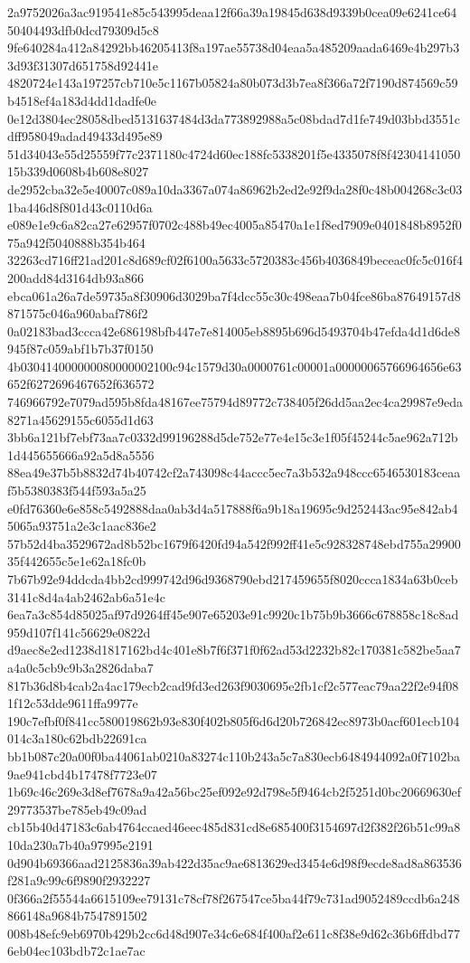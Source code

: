 {2a9752026a3ac919541e85c543995deaa12f66a39a19845d638d9339b0cea09e6241ce6450404493dfb0dcd79309d5c8
9fe640284a412a84292bb46205413f8a197ae55738d04eaa5a485209aada6469e4b297b33d93f31307d651758d92441e
4820724e143a197257cb710e5c1167b05824a80b073d3b7ea8f366a72f7190d874569c59b4518ef4a183d4dd1dadfe0e
0e12d3804ec28058dbed5131637484d3da773892988a5c08bdad7d1fe749d03bbd3551cdff958049adad49433d495e89
51d34043e55d25559f77c2371180c4724d60ec188fc5338201f5e4335078f8f4230414105015b339d0608b4b608e8027
de2952cba32e5e40007c089a10da3367a074a86962b2ed2e92f9da28f0c48b004268c3c031ba446d8f801d43c0110d6a
e089e1e9c6a82ca27e62957f0702c488b49ec4005a85470a1e1f8ed7909e0401848b8952f075a942f5040888b354b464
32263cd716ff21ad201c8d689cf02f6100a5633c5720383c456b4036849beceac0fc5c016f4200add84d3164db93a866
ebca061a26a7de59735a8f30906d3029ba7f4dcc55c30c498eaa7b04fce86ba87649157d8871575c046a960abaf786f2
0a02183bad3ccca42e686198bfb447e7e814005eb8895b696d5493704b47efda4d1d6de8945f87c059abf1b7b37f0150
4b030414000000080000002100c94c1579d30a0000761c00001a00000065766964656e63652f6272696467652f636572
746966792e7079ad595b8fda48167ee75794d89772c738405f26dd5aa2ec4ca29987e9eda8271a45629155c6055d1d63
3bb6a121bf7ebf73aa7c0332d99196288d5de752e77e4e15c3e1f05f45244c5ae962a712b1d445655666a92a5d8a5556
88ea49e37b5b8832d74b40742cf2a743098c44accc5ec7a3b532a948ccc6546530183ceaaf5b5380383f544f593a5a25
e0fd76360e6e858c5492888daa0ab3d4a517888f6a9b18a19695c9d252443ac95e842ab45065a93751a2e3c1aac836e2
57b52d4ba3529672ad8b52bc1679f6420fd94a542f992ff41e5c928328748ebd755a2990035f442655c5e1e62a18fc0b
7b67b92e94ddcda4bb2cd999742d96d9368790ebd217459655f8020ccca1834a63b0ceb3141c8d4a4ab2462ab6a51e4c
6ea7a3c854d85025af97d9264ff45e907e65203e91c9920c1b75b9b3666c678858c18c8ad959d107f141c56629e0822d
d9aec8e2ed1238d1817162bd4c401e8b7f6f371f0f62ad53d2232b82c170381c582be5aa7a4a0c5cb9c9b3a2826daba7
817b36d8b4cab2a4ac179ecb2cad9fd3ed263f9030695e2fb1cf2c577eac79aa22f2e94f081f12c53dde9611ffa9977e
190c7efbf0f841cc580019862b93e830f402b805f6d6d20b726842ec8973b0acf601ecb104014c3a180c62bdb22691ca
bb1b087c20a00f0ba44061ab0210a83274c110b243a5c7a830ecb6484944092a0f7102ba9ae941cbd4b17478f7723e07
1b69c46c269e3d8ef7678a9a42a56bc25ef092e92d798e5f9464cb2f5251d0bc20669630ef29773537be785eb49c09ad
cb15b40d47183c6ab4764ccaed46eec485d831cd8e685400f3154697d2f382f26b51c99a810da230a7b40a97995e2191
0d904b69366aad2125836a39ab422d35ac9ae6813629ed3454e6d98f9ecde8ad8a863536f281a9c99c6f9890f2932227
0f366a2f55544a6615109ee79131c78cf78f267547ce5ba44f79c731ad9052489ccdb6a248866148a9684b7547891502
008b48efc9eb6970b429b2cc6d48d907e34c6e684f400af2e611c8f38e9d62c36b6ffdbd776eb04ec103bdb72c1ae7ac
}
